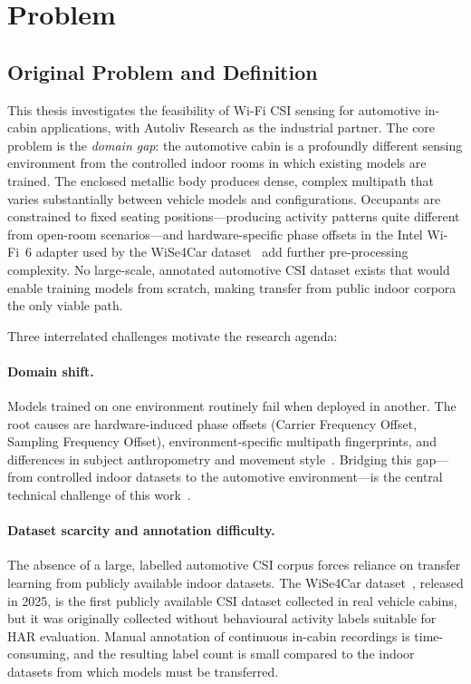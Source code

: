 \documentclass[english,bibtex]{kththesis}
\begin{document}
\section{Problem}
\label{sec:problem}

\subsection{Original Problem and Definition}
\label{sec:problem-def}

This thesis investigates the feasibility of Wi-Fi CSI sensing for automotive in-cabin applications, with Autoliv Research as the industrial partner. The core problem is the \emph{domain gap}: the automotive cabin is a profoundly different sensing environment from the controlled indoor rooms in which existing models are trained. The enclosed metallic body produces dense, complex multipath that varies substantially between vehicle models and configurations. Occupants are constrained to fixed seating positions---producing activity patterns quite different from open-room scenarios---and hardware-specific phase offsets in the Intel Wi-Fi~6 adapter used by the WiSe4Car dataset~\cite{markert2025wise4car} add further pre-processing complexity. No large-scale, annotated automotive CSI dataset exists that would enable training models from scratch, making transfer from public indoor corpora the only viable path.

Three interrelated challenges motivate the research agenda:

\paragraph{Domain shift.}
Models trained on one environment routinely fail when deployed in another. The root causes are hardware-induced phase offsets (Carrier Frequency Offset, Sampling Frequency Offset), environment-specific multipath fingerprints, and differences in subject anthropometry and movement style~\cite{zou2018robust,zhang2018crosssense}. Bridging this gap---from controlled indoor datasets to the automotive environment---is the central technical challenge of this work~\cite{yang2020mobileda,bu2021transfersense,wang2026survey}.

\paragraph{Dataset scarcity and annotation difficulty.}
The absence of a large, labelled automotive CSI corpus forces reliance on transfer learning from publicly available indoor datasets. The WiSe4Car dataset~\cite{markert2025wise4car}, released in 2025, is the first publicly available CSI dataset collected in real vehicle cabins, but it was originally collected without behavioural activity labels suitable for HAR evaluation. Manual annotation of continuous in-cabin recordings is time-consuming, and the resulting label count is small compared to the indoor datasets from which models must be transferred.
\end{document}
